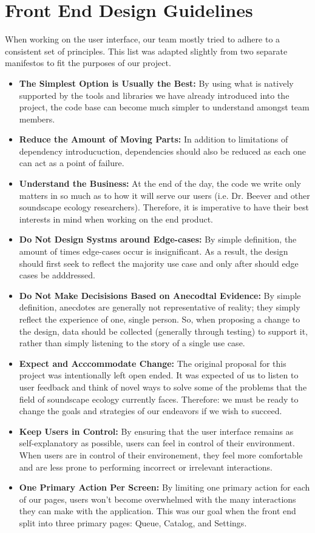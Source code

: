 \section{Front End Design Guidelines}
When working on the user interface, our team mostly tried to adhere to a consistent set of principles. This list was adapted slightly from two separate manifestos to fit the purposes of our project.\par

\begin{itemize}
\item \textbf{The Simplest Option is Usually the Best:} By using what is natively supported by the tools and libraries we have already introduced into the project, the code base can become much simpler to understand amongst team members.
\item \textbf{Reduce the Amount of Moving Parts:} In addition to limitations of dependency introducuction, dependencies should also be reduced as each one can act as a point of failure.
\item \textbf{Understand the Business:} At the end of the day, the code we write only matters in so much as to how it will serve our users (i.e. Dr. Beever and other soundscape ecology researchers). Therefore, it is imperative to have their best interests in mind when working on the end product.
\item \textbf{Do Not Design Systms around Edge-cases:} By simple definition, the amount of times edge-cases occur is insignificant. As a result, the design should first seek to reflect the majority use case and only after should edge cases be adddressed.
\item \textbf{Do Not Make Decisisions Based on Anecodtal Evidence:} By simple definition, anecdotes are generally not representative of reality; they simply reflect the experience of one, single person. So, when proposing a change to the design, data should be collected (generally through testing) to support it, rather than simply listening to the story of a single use case.
\item \textbf{Expect and Acccommodate Change:} The original proposal for this project was intentionally left open ended. It was expected of us to listen to user feedback and think of novel ways to solve some of the problems that the field of soundscape ecology currently faces. Therefore: we must be ready to change the goals and strategies of our endeavors if we wish to succeed.
\item \textbf{Keep Users in Control:} By ensuring that the user interface remains as self-explanatory as possible, users can feel in control of their environment. When users are in control of their environement, they feel more comfortable and are less prone to performing incorrect or irrelevant interactions.
\item \textbf{One Primary Action Per Screen:} By limiting one primary action for each of our pages, users won't become overwhelmed with the many interactions they can make with the application. This was our goal when the front end split into three primary pages: Queue, Catalog, and Settings.
\end{itemize}
